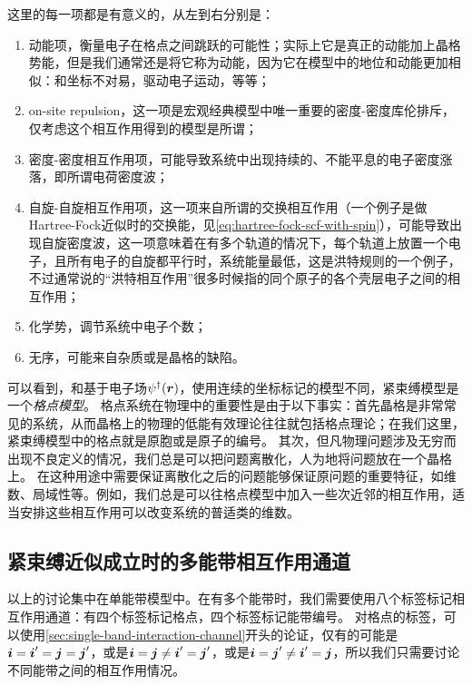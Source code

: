 这里的每一项都是有意义的，从左到右分别是：
\begin{enumerate}
    \item 动能项，衡量电子在格点之间跳跃的可能性；实际上它是真正的动能加上晶格势能，但是我们通常还是将它称为动能，因为它在模型中的地位和动能更加相似：和坐标不对易，驱动电子运动，等等；
    \item on-site repulsion，这一项是宏观经典模型中唯一重要的密度-密度库伦排斥，仅考虑这个相互作用得到的模型是所谓；
    \item 密度-密度相互作用项，可能导致系统中出现持续的、不能平息的电子密度涨落，即所谓电荷密度波；
    \item 自旋-自旋相互作用项，这一项来自所谓的交换相互作用（一个例子是做Hartree-Fock近似时的交换能，见\eqref{eq:hartree-fock-scf-with-spin}），可能导致出现自旋密度波，这一项意味着在有多个轨道的情况下，每个轨道上放置一个电子，且所有电子的自旋都平行时，系统能量最低，这是洪特规则的一个例子，不过通常说的“洪特相互作用”很多时候指的同个原子的各个壳层电子之间的相互作用；
    \item 化学势，调节系统中电子个数；
    \item 无序，可能来自杂质或是晶格的缺陷。
\end{enumerate}

可以看到，和基于电子场$\psi^\dagger(\vb*{r})$，使用连续的坐标标记的模型不同，紧束缚模型是一个\emph{格点模型}。
格点系统在物理中的重要性是由于以下事实：首先晶格是非常常见的系统，从而晶格上的物理的低能有效理论往往就包括格点理论；在我们这里，紧束缚模型中的格点就是原胞或是原子的编号。
其次，但凡物理问题涉及无穷而出现不良定义的情况，我们总是可以把问题离散化，人为地将问题放在一个晶格上。
在这种用途中需要保证离散化之后的问题能够保证原问题的重要特征，如维数、局域性等。例如，我们总是可以往格点模型中加入一些次近邻的相互作用，适当安排这些相互作用可以改变系统的普适类的维数。

\subsection{紧束缚近似成立时的多能带相互作用通道}

以上的讨论集中在单能带模型中。在有多个能带时，我们需要使用八个标签标记相互作用通道：有四个标签标记格点，四个标签标记能带编号。
对格点的标签，可以使用\autoref{sec:single-band-interaction-channel}开头的论证，仅有的可能是$\vb*{i}=\vb*{i}'=\vb*{j}=\vb*{j}'$，或是$\vb*{i}=\vb*{j} \neq \vb*{i}'=\vb*{j}'$，或是$\vb*{i}=\vb*{j}' \neq \vb*{i}' = \vb*{j}$，所以我们只需要讨论不同能带之间的相互作用情况。

